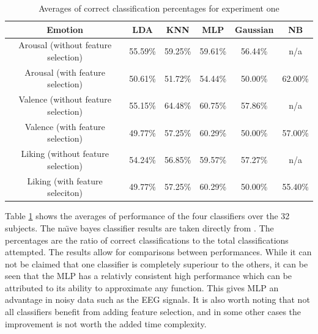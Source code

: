 \documentclass[12pt, a4paper, fleqn]{memoir}%
\begin{document}
\begin{table}[!h]
	\begin{tabular}{| c | c | c | c | c | c |}
		\hline \hline
		Emotion					& LDA	  & KNN	    & MLP     & Gaussian & NB      \\
		\hline \hline
		Arousal (without feature selection)	& 55.59\% & 59.25\% & 59.61\% & 56.44\%  & n/a     \\ \hline
		Arousal (with feature selection)        & 50.61\% & 51.72\% & 54.44\% & 50.00\%  & 62.00\% \\ \hline
		\hline
		Valence (without feature selection)     & 55.15\% & 64.48\% & 60.75\% & 57.86\%  & n/a     \\ \hline
		Valence (with feature selection)	& 49.77\% & 57.25\% & 60.29\% & 50.00\%	 & 57.00\% \\ \hline
		\hline
		Liking  (without feature selection)	& 54.24\% & 56.85\% & 59.57\% & 57.27\%  & n/a     \\ \hline
		Liking  (with feature seleciton)	& 49.77\% & 57.25\% & 60.29\% & 50.00\%  & 55.40\% \\ \hline
		\hline
	\end{tabular}
	\caption{Averages of correct classification percentages for experiment one}
	\label{table:exp1}
\end{table}

Table \ref{table:exp1} shows the averages of performance of the four classifiers over the 32 subjects. The na\"{\i}ve bayes classifier results are taken directly from \cite{koelstra2012deap}. The percentages are the ratio of correct classifications to the total classifications attempted. The results allow for comparisons between performances. While it can not be claimed that one classifier is completely superiour to the others, it can be seen that the MLP has a relativly consistent high performance which can be attributed to its ability to approximate any function. This gives MLP an advantage in noisy data such as the EEG signals. It is also worth noting that not all classifiers benefit from adding feature selection, and in some other cases the improvement is not worth the added time complexity.
\end{document}
